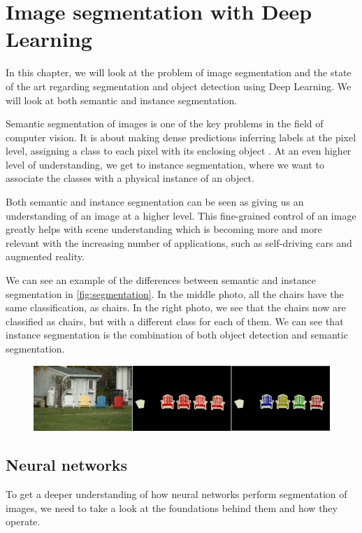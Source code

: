 \chapter{Image segmentation with Deep Learning}
In this chapter, we will look at the problem of image segmentation and the state of the art regarding segmentation and object detection using Deep Learning. We will look at both semantic and instance segmentation.

Semantic segmentation of images is one of the key problems in the field of computer vision. It is about making dense predictions inferring labels at the pixel level, assigning a class to each pixel with its enclosing object \cite{Garcia-Garcia2017}. At an even higher level of understanding, we get to instance segmentation, where we want to associate the classes with a physical instance of an object. 

Both semantic and instance segmentation can be seen as giving us an understanding of an image at a higher level. This fine-grained control of an image greatly helps with scene understanding which is becoming more and more relevant with the increasing number of applications, such as self-driving cars and augmented reality. 

We can see an example of the differences between semantic and instance segmentation in \autoref{fig:segmentation}. In the middle photo, all the chairs have the same classification, as chairs. In the right photo, we see that the chairs now are classified as chairs, but with a different class for each of them. We can see that instance segmentation is the combination of both object detection and semantic segmentation.

\begin{figure}[H]
    \centering
    \includegraphics[width=\linewidth]{fig/se.png}
    \label{fig:segmentation}
\end{figure}


\section{Neural networks}
To get a deeper understanding of how neural networks perform segmentation of images, we need to take a look at the foundations behind them and how they operate.

